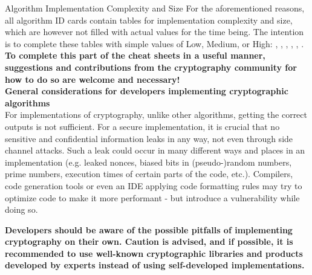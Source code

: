 \begin{algorithmbox}{Algorithm Implementation Complexity and Size \tbd}
    For the aforementioned reasons, all algorithm ID cards contain tables for implementation complexity and size, which are however not filled with actual values for the time being. The intention is to complete these tables with simple values of Low, Medium, or High: \hspace{-2mm}, \hspace{-2mm}, \hspace{-2mm}, \hspace{-2mm}, \hspace{-2mm}, \hspace{-2mm}.\\[\baselineskip]

    \textcolor{themeblue}{\bfseries To complete this part of the cheat sheets in a useful manner, suggestions and contributions from the cryptography community for how to do so are welcome and necessary!}\\[3\baselineskip]

    {\bfseries General considerations for developers implementing cryptographic algorithms}\\[\baselineskip]

    For implementations of cryptography, unlike other algorithms, getting the correct outputs is not sufficient. For a secure implementation, it is crucial that no sensitive and confidential information leaks in any way, not even through side channel attacks. Such a leak could occur in many different ways and places in an implementation (e.g. leaked nonces, biased bits in (pseudo-)random numbers, prime numbers, execution times of certain parts of the code, etc.). Compilers, code generation tools or even an IDE applying code formatting rules may try to optimize code to make it more performant - but introduce a vulnerability while doing so.\\[2\baselineskip]

    \begin{minipage}[t]{0.05\textwidth} %
    \end{minipage}
    \hfill
    \begin{minipage}[T]{0.94\textwidth} %
        \bfseries Developers should be aware of the possible pitfalls of implementing cryptography on their own. Caution is advised, and if possible, it is recommended to use well-known cryptographic libraries and products developed by experts instead of using self-developed implementations.
    \end{minipage}


\end{algorithmbox}
